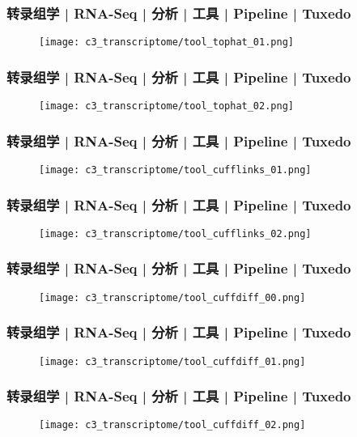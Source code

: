 \begin{frame}
  \frametitle{转录组学 | RNA-Seq | 分析 | 工具 | Pipeline | Tuxedo}
  \begin{figure}
    \centering
    \texttt{[image: c3\_transcriptome/tool\_tophat\_01.png]}
  \end{figure}
\end{frame}

\begin{frame}
  \frametitle{转录组学 | RNA-Seq | 分析 | 工具 | Pipeline | Tuxedo}
  \begin{figure}
    \centering
    \texttt{[image: c3\_transcriptome/tool\_tophat\_02.png]}
  \end{figure}
\end{frame}

\begin{frame}
  \frametitle{转录组学 | RNA-Seq | 分析 | 工具 | Pipeline | Tuxedo}
  \begin{figure}
    \centering
    \texttt{[image: c3\_transcriptome/tool\_cufflinks\_01.png]}
  \end{figure}
\end{frame}

\begin{frame}
  \frametitle{转录组学 | RNA-Seq | 分析 | 工具 | Pipeline | Tuxedo}
  \begin{figure}
    \centering
    \texttt{[image: c3\_transcriptome/tool\_cufflinks\_02.png]}
  \end{figure}
\end{frame}

\begin{frame}
  \frametitle{转录组学 | RNA-Seq | 分析 | 工具 | Pipeline | Tuxedo}
  \begin{figure}
    \centering
    \texttt{[image: c3\_transcriptome/tool\_cuffdiff\_00.png]}
  \end{figure}
\end{frame}

\begin{frame}
  \frametitle{转录组学 | RNA-Seq | 分析 | 工具 | Pipeline | Tuxedo}
  \begin{figure}
    \centering
    \texttt{[image: c3\_transcriptome/tool\_cuffdiff\_01.png]}
  \end{figure}
\end{frame}

\begin{frame}
  \frametitle{转录组学 | RNA-Seq | 分析 | 工具 | Pipeline | Tuxedo}
  \begin{figure}
    \centering
    \texttt{[image: c3\_transcriptome/tool\_cuffdiff\_02.png]}
  \end{figure}
\end{frame}

